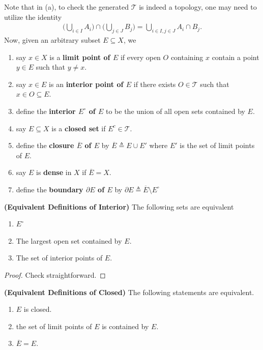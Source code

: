 \documentclass{report}
\begin{document}
\begin{mdframed}
Note that in (a), to check the generated $\mathscr{T}$ is indeed a topology, one may need to utilize the identity
\begin{align*}
\Big( \bigcup_{i \in I} A_i \Big) \cap \Big( \bigcup_{j \in J} B_j \Big) = \bigcup_{i \in I, j \in J} A_i \cap B_j.
\end{align*}
Now, given an arbitrary subset $E\subseteq X$, we 
\begin{enumerate}[label=(\alph*)]
  \item say $x\in X$ is a \textbf{limit point of $E$} if every open $O$ containing $x$ contain a point $y\in E$ such that $y \neq x$.
  \item say $x\in E$ is an \textbf{interior point of $E$} if there exists $O\in \mathscr{T }$ such that $x \in O \subseteq E$.
  \item define the \textbf{interior $E^\circ $ of $E$} to be the union of all open sets contained by  $E$.
   \item say $E\subseteq X$ is a \textbf{closed set} if $E^c \in \mathscr{T }$.
   \item define the \textbf{closure $\overline{E}$ of $E$} by $\overline{E}\triangleq E\cup E'$ where $E'$ is the set of limit points of $E$. 
    \item say $E$ is \textbf{dense} in $X$ if  $\overline{E}=X$.
    \item define the \textbf{boundary $\partial E$ of $E$} by $\partial E\triangleq \overline{E}\setminus E^\circ $
\end{enumerate}
\end{mdframed}
\begin{theorem}
\textbf{(Equivalent Definitions of Interior)} The following sets are equivalent
\begin{enumerate}[label=(\alph*)]
  \item $E^\circ $
  \item The largest open set contained by $E$.
  \item The set of interior points of $E$.
\end{enumerate}
\end{theorem}
\begin{proof}
Check straightforward.
\end{proof}
\begin{theorem}
\textbf{(Equivalent Definitions of Closed)} The following statements are equivalent.
\begin{enumerate}[label=(\alph*)]
  \item $E$ is closed.
  \item the set of limit points of $E$ is contained by $E$.
  \item $\overline{E}=E$.
\end{enumerate}
\end{theorem}
\end{document}
